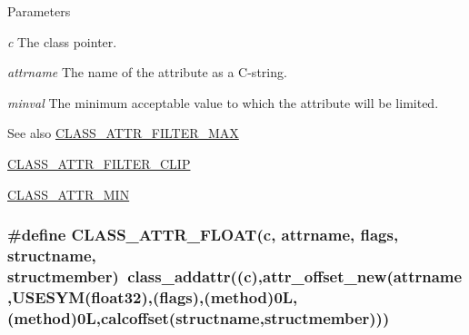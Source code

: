 \begin{DoxyParams}{Parameters}
\item[{\em c}]The class pointer. \item[{\em attrname}]The name of the attribute as a C-\/string. \item[{\em minval}]The minimum acceptable value to which the attribute will be limited. \end{DoxyParams}
\begin{DoxySeeAlso}{See also}
\hyperlink{group__attr_ga6d756455a9923aa01a16796b7d458fd9}{CLASS\_\-ATTR\_\-FILTER\_\-MAX} 

\hyperlink{group__attr_ga7a9fa82b3419df8a770830fb34df39b0}{CLASS\_\-ATTR\_\-FILTER\_\-CLIP} 

\hyperlink{group__attr_gaa4c359315d2cefa59ed8b1200411d85a}{CLASS\_\-ATTR\_\-MIN} 
\end{DoxySeeAlso}
\hypertarget{group__attr_ga037bd219fe11f1f2e73d1257ca508047}{
\subsubsection[{CLASS\_\-ATTR\_\-FLOAT}]{\setlength{\rightskip}{0pt plus 5cm}\#define CLASS\_\-ATTR\_\-FLOAT(c, \/  attrname, \/  flags, \/  structname, \/  structmember)~class\_\-addattr((c),attr\_\-offset\_\-new(attrname,USESYM(float32),(flags),({\bf method})0L,(method)0L,calcoffset(structname,structmember)))}}
\label{group__attr_ga037bd219fe11f1f2e73d1257ca508047}


